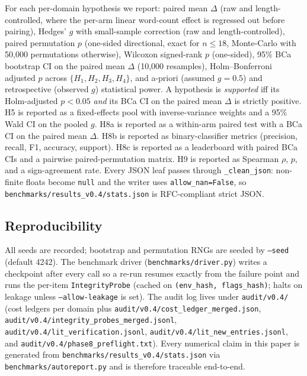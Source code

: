 For each per-domain hypothesis we report: paired mean $\Delta$ (raw and length-controlled, where the per-arm linear word-count effect is regressed out before pairing), Hedges' $g$ with small-sample correction (raw and length-controlled), paired permutation $p$ (one-sided directional, exact for $n \le 18$, Monte-Carlo with 50,000 permutations otherwise), Wilcoxon signed-rank $p$ (one-sided), 95\% BCa bootstrap CI on the paired mean $\Delta$ (10,000 resamples), Holm--Bonferroni adjusted $p$ across $\{H_1, H_2, H_3, H_4\}$, and a-priori (assumed $g{=}0.5$) and retrospective (observed $g$) statistical power. A hypothesis is \emph{supported} iff its Holm-adjusted $p<0.05$ \emph{and} its BCa CI on the paired mean $\Delta$ is strictly positive. H5 is reported as a fixed-effects pool with inverse-variance weights and a 95\% Wald CI on the pooled $g$. H8a is reported as a within-arm paired test with a BCa CI on the paired mean $\Delta$. H8b is reported as binary-classifier metrics (precision, recall, F1, accuracy, support). H8c is reported as a leaderboard with paired BCa CIs and a pairwise paired-permutation matrix. H9 is reported as Spearman $\rho$, $p$, and a sign-agreement rate. Every JSON leaf passes through \texttt{\_clean\_json}: non-finite floats become \texttt{null} and the writer uses \texttt{allow\_nan=False}, so \nolinkurl{benchmarks/results_v0.4/stats.json} is RFC-compliant strict JSON.

\subsection{Reproducibility}

All seeds are recorded; bootstrap and permutation RNGs are seeded by \texttt{--seed} (default 4242). The benchmark driver (\texttt{benchmarks/driver.py}) writes a checkpoint after every call so a re-run resumes exactly from the failure point and runs the per-item \texttt{IntegrityProbe} (cached on \texttt{(env\_hash, flags\_hash)}; halts on leakage unless \texttt{--allow-leakage} is set). The audit log lives under \nolinkurl{audit/v0.4/} (cost ledgers per domain plus \nolinkurl{audit/v0.4/cost_ledger_merged.json}, \nolinkurl{audit/v0.4/integrity_probes_merged.jsonl}, \nolinkurl{audit/v0.4/lit_verification.jsonl}, \nolinkurl{audit/v0.4/lit_new_entries.jsonl}, and \nolinkurl{audit/v0.4/phase8_preflight.txt}). Every numerical claim in this paper is generated from \nolinkurl{benchmarks/results_v0.4/stats.json} via \texttt{benchmarks/autoreport.py} and is therefore traceable end-to-end.

